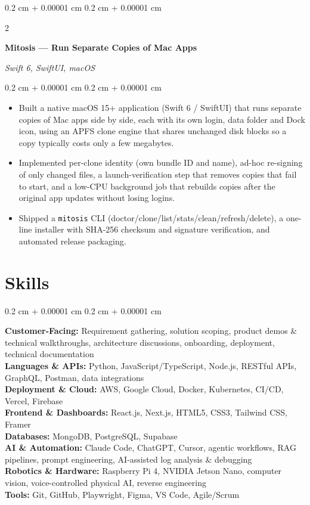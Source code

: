 \documentclass[10pt, letterpaper]{article}
\newenvironment{highlights}{
    \begin{itemize}[
        topsep=0.10 cm,
        parsep=0.10 cm,
        partopsep=0pt,
        itemsep=0pt,
        leftmargin=0.4 cm + 10pt
    ]
}{
    \end{itemize}
} %
\newenvironment{onecolentry}{
    \begin{adjustwidth}{
        0.2 cm + 0.00001 cm
    }{
        0.2 cm + 0.00001 cm
    }
}{
    \end{adjustwidth}
} %
\newenvironment{twocolentry}[2][]{
    \onecolentry
    \def\secondColumn{#2}
    \setcolumnwidth{\fill, 5.0 cm}
    \begin{paracol}{2}
}{
    \switchcolumn \raggedleft \secondColumn
    \end{paracol}
    \endonecolentry
} %
\let\hrefWithoutArrow\href
\renewcommand{\href}[2]{\hrefWithoutArrow{#1}{\ifthenelse{\equal{#2}{}}{ }{#2 }\raisebox{.15ex}{\footnotesize \faExternalLink*}}}
\begin{document}
    \vspace{0.12 cm}
    \begin{twocolentry}{
        \textit{Swift 6, SwiftUI, macOS}
    }
        \textbf{Mitosis --- Run Separate Copies of Mac Apps} \href{https://github.com/deadhearth01/Mitosis}{\faGithub}
    \end{twocolentry}
    \vspace{0.10 cm}
    \begin{onecolentry}
        \begin{highlights}
            \item Built a native macOS 15+ application (Swift 6 / SwiftUI) that runs separate copies of Mac apps side by side, each with its own login, data folder and Dock icon, using an APFS clone engine that shares unchanged disk blocks so a copy typically costs only a few megabytes.
            \item Implemented per-clone identity (own bundle ID and name), ad-hoc re-signing of only changed files, a launch-verification step that removes copies that fail to start, and a low-CPU background job that rebuilds copies after the original app updates without losing logins.
            \item Shipped a \texttt{mitosis} CLI (doctor/clone/list/stats/clean/refresh/delete), a one-line installer with SHA-256 checksum and signature verification, and automated release packaging.
        \end{highlights}
    \end{onecolentry}

    \section{Skills}
    \begin{onecolentry}
        \textbf{Customer-Facing:} Requirement gathering, solution scoping, product demos \& technical walkthroughs, architecture discussions, onboarding, deployment, technical documentation \\
        \textbf{Languages \& APIs:} Python, JavaScript/TypeScript, Node.js, RESTful APIs, GraphQL, Postman, data integrations \\
        \textbf{Deployment \& Cloud:} AWS, Google Cloud, Docker, Kubernetes, CI/CD, Vercel, Firebase \\
        \textbf{Frontend \& Dashboards:} React.js, Next.js, HTML5, CSS3, Tailwind CSS, Framer \\
        \textbf{Databases:} MongoDB, PostgreSQL, Supabase \\
        \textbf{AI \& Automation:} Claude Code, ChatGPT, Cursor, agentic workflows, RAG pipelines, prompt engineering, AI-assisted log analysis \& debugging \\
        \textbf{Robotics \& Hardware:} Raspberry Pi 4, NVIDIA Jetson Nano, computer vision, voice-controlled physical AI, reverse engineering \\
        \textbf{Tools:} Git, GitHub, Playwright, Figma, VS Code, Agile/Scrum
    \end{onecolentry}
\end{document}
